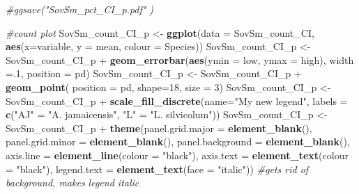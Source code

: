 \documentclass[]{article}
\newenvironment{Shaded}{\begin{snugshade}}{\end{snugshade}}
\newcommand{\KeywordTok}[1]{\textcolor[rgb]{0.13,0.29,0.53}{\textbf{{#1}}}}
\newcommand{\DataTypeTok}[1]{\textcolor[rgb]{0.13,0.29,0.53}{{#1}}}
\newcommand{\DecValTok}[1]{\textcolor[rgb]{0.00,0.00,0.81}{{#1}}}
\newcommand{\StringTok}[1]{\textcolor[rgb]{0.31,0.60,0.02}{{#1}}}
\newcommand{\CommentTok}[1]{\textcolor[rgb]{0.56,0.35,0.01}{\textit{{#1}}}}
\newcommand{\NormalTok}[1]{{#1}}
\begin{document}
\begin{Shaded}
\begin{Highlighting}[]
\CommentTok{#ggsave("SovSm_pct_CI_p.pdf"  )}

\CommentTok{#count plot}
\NormalTok{SovSm_count_CI_p <-}\StringTok{ }\KeywordTok{ggplot}\NormalTok{(}\DataTypeTok{data =} \NormalTok{SovSm_count_CI, }\KeywordTok{aes}\NormalTok{(}\DataTypeTok{x=}\NormalTok{variable, }\DataTypeTok{y =} \NormalTok{mean, }\DataTypeTok{colour =} \NormalTok{Species))}
\NormalTok{SovSm_count_CI_p <-}\StringTok{ }\NormalTok{SovSm_count_CI_p +}\StringTok{ }\KeywordTok{geom_errorbar}\NormalTok{(}\KeywordTok{aes}\NormalTok{(}\DataTypeTok{ymin =} \NormalTok{low, }\DataTypeTok{ymax =} \NormalTok{high), }\DataTypeTok{width =}\NormalTok{.}\DecValTok{1}\NormalTok{, }\DataTypeTok{position =} \NormalTok{pd)}
\NormalTok{SovSm_count_CI_p <-}\StringTok{ }\NormalTok{SovSm_count_CI_p +}\StringTok{ }\KeywordTok{geom_point}\NormalTok{( }\DataTypeTok{position =} \NormalTok{pd, }\DataTypeTok{shape=}\DecValTok{18}\NormalTok{, }\DataTypeTok{size =} \DecValTok{3}\NormalTok{)}
\NormalTok{SovSm_count_CI_p <-}\StringTok{ }\NormalTok{SovSm_count_CI_p +}\StringTok{ }\KeywordTok{scale_fill_discrete}\NormalTok{(}\DataTypeTok{name=}\StringTok{"My new legend"}\NormalTok{, }\DataTypeTok{labels =} \KeywordTok{c}\NormalTok{(}\StringTok{"AJ"} \NormalTok{=}\StringTok{ "A. jamaicensis"}\NormalTok{, }\StringTok{"L"} \NormalTok{=}\StringTok{ "L. silvicolum"}\NormalTok{)) }
\NormalTok{SovSm_count_CI_p <-}\StringTok{ }\NormalTok{SovSm_count_CI_p +}\StringTok{ }\KeywordTok{theme}\NormalTok{(}\DataTypeTok{panel.grid.major =} \KeywordTok{element_blank}\NormalTok{(), }\DataTypeTok{panel.grid.minor =} \KeywordTok{element_blank}\NormalTok{(),}
\DataTypeTok{panel.background =} \KeywordTok{element_blank}\NormalTok{(), }\DataTypeTok{axis.line =} \KeywordTok{element_line}\NormalTok{(}\DataTypeTok{colour =} \StringTok{"black"}\NormalTok{), }\DataTypeTok{axis.text =} \KeywordTok{element_text}\NormalTok{(}\DataTypeTok{colour =} \StringTok{"black"}\NormalTok{), }\DataTypeTok{legend.text =} \KeywordTok{element_text}\NormalTok{(}\DataTypeTok{face =} \StringTok{"italic"}\NormalTok{))  }\CommentTok{#gets rid of background, makes legend italic}


\end{Highlighting}
\end{Shaded}
\end{document}
